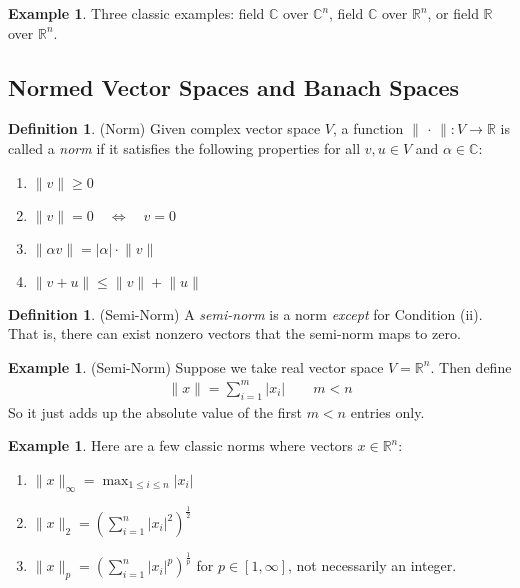 \documentclass[12pt]{article}
\numberwithin{equation}{section} %
\theoremstyle{plain}
\theoremstyle{definition}
\newtheorem{defn}[thm]{Definition}
\newtheorem{ex}[thm]{Example}
\theoremstyle{remark}
\newcommand{\R}{\mathbb{R}}
\newcommand{\Rn}{\mathbb{R}^n}
\newcommand{\C}{\mathbb{C}}
\newcommand{\Cn}{\mathbb{C}^n}
\begin{document}
\begin{ex}
Three classic examples: field $\C$ over $\Cn$, field $\C$ over $\Rn$, or
field $\R$ over $\Rn$.
\end{ex}

\clearpage
\subsection{Normed Vector Spaces and Banach Spaces}


\begin{defn}(Norm)
Given complex vector space $V$, a function
$\lVert\,\cdot\,\rVert:V\rightarrow \R$ is called a \emph{norm} if it
satisfies the following properties for all $v,u\in V$ and $\alpha\in
\C$:
\begin{enumerate}[label=(\roman*)]
  \item $\lVert v\rVert\geq 0$
  \item $\lVert v\rVert=0 \quad \iff \quad v=0$
  \item $\lVert \alpha v\rVert= |\alpha| \cdot \lVert v\rVert$
  \item $\lVert v+u\rVert \leq \lVert v\rVert + \lVert u\rVert$
\end{enumerate}
\end{defn}

\begin{defn}(Semi-Norm)
A \emph{semi-norm} is a norm \emph{except} for Condition (ii). That is,
there can exist nonzero vectors that the semi-norm maps to zero.
\end{defn}

\begin{ex}(Semi-Norm)
Suppose we take real vector space $V=\Rn$. Then define
\begin{align*}
  \lVert x\rVert = \sum_{i=1}^m |x_i|
  \qquad m < n
\end{align*}
So it just adds up the absolute value of the first $m<n$ entries only.
\end{ex}

\begin{ex}
Here are a few classic norms where vectors $x\in \Rn$:
\begin{enumerate}
\item $\lVert x\rVert_\infty = \max_{1\leq i\leq n} |x_i|$
\item $\lVert x\rVert_2 = \left(\sum_{i=1}^n |x_i|^2\right)^{\frac{1}{2}}$
\item $\lVert x\rVert_p = \left(\sum_{i=1}^n
  |x_i|^p\right)^{\frac{1}{p}}$ for $p\in[1,\infty]$, not necessarily an
  integer.
\end{enumerate}
\end{ex}
\end{document}
